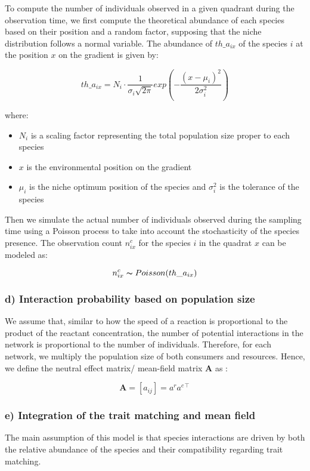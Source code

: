 To compute the number of individuals observed in a given quadrant during the observation time, we first compute the theoretical abundance of each species based on their position and a random factor, supposing that the niche distribution follows a normal variable.
The abundance of $th\_a_{ix}$ of the species $i$ at the position $x$ on the gradient is given by:

$$
    th\_a_{ix} = N_i \cdot \frac{1}{\sigma_i\sqrt{2\pi}} exp \left( -\frac{(x-\mu_i)^2}{2\sigma_i^2} \right)
$$

where:
\begin{itemize}
    \item $N_i$ is a scaling factor representing the total population size proper to each species
    \item $x$ is the environmental position on the gradient
    \item $\mu_i$ is the niche optimum position of the species and $\sigma_i^2$ is the tolerance of the species
\end{itemize}

Then we simulate the actual number of individuals observed during the sampling time using a Poisson process to take into account the stochasticity of the species presence. The observation count $n_{ix}^c$ for the species $i$ in the quadrat $x$ can be modeled as:

$$
    n_{ix}^c \thicksim Poisson(th\_a_{ix})
$$

\subsubsection{d) Interaction probability based on population size}

We assume that, similar to how the speed of a reaction is proportional to the product of the reactant concentration, the number of potential interactions in the network is proportional to the number of individuals. Therefore, for each network, we multiply the population size of both consumers and resources. 
Hence, we define the neutral effect matrix/ mean-field matrix $\mathbf{A}$ as : 

$$
    \mathbf{A} = [a_{ij}] = a^r a^{c\intercal}
$$

\subsubsection{e) Integration of the trait matching and mean field}

The main assumption of this model is that species interactions are driven by both the relative abundance of the species and their compatibility regarding trait matching.

